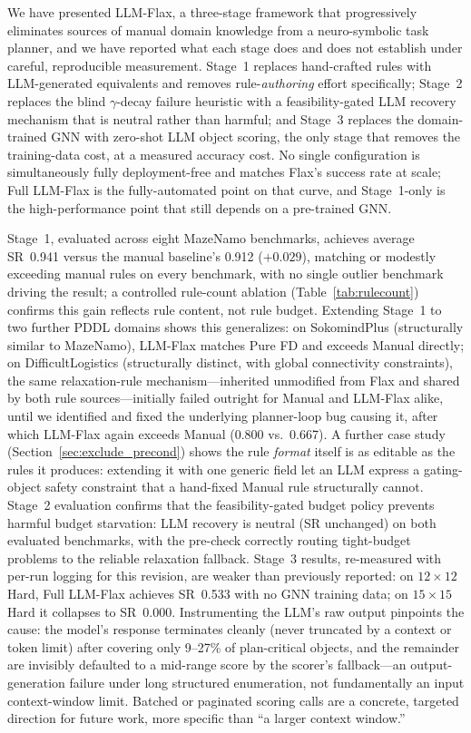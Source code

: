 \documentclass[letterpaper, 10pt, journal, twoside]{IEEEtran}
\newcommand{\sref}[1]{Section~\ref{#1}}
\newcommand{\tref}[1]{Table~\ref{#1}}
\newcommand{\method}{LLM-Flax\xspace}
\newcommand{\baseline}{Flax\xspace}
\newcommand{\fullmethod}{Full LLM-Flax\xspace}
\begin{document}
We have presented \method, a three-stage framework that progressively eliminates sources of manual domain knowledge from a neuro-symbolic task planner, and we have reported what each stage does and does not establish under careful, reproducible measurement.
Stage~1 replaces hand-crafted rules with LLM-generated equivalents and removes rule-\emph{authoring} effort specifically; Stage~2 replaces the blind $\gamma$-decay failure heuristic with a feasibility-gated LLM recovery mechanism that is neutral rather than harmful; and Stage~3 replaces the domain-trained GNN with zero-shot LLM object scoring, the only stage that removes the training-data cost, at a measured accuracy cost.
No single configuration is simultaneously fully deployment-free and matches \baseline's success rate at scale; \fullmethod is the fully-automated point on that curve, and Stage~1-only is the high-performance point that still depends on a pre-trained GNN.

Stage~1, evaluated across eight MazeNamo benchmarks, achieves average SR~0.941 versus the manual baseline's 0.912 ($+0.029$), matching or modestly exceeding manual rules on every benchmark, with no single outlier benchmark driving the result; a controlled rule-count ablation (\tref{tab:rulecount}) confirms this gain reflects rule content, not rule budget.
Extending Stage~1 to two further PDDL domains shows this generalizes: on SokomindPlus (structurally similar to MazeNamo), \method matches Pure FD and exceeds Manual directly; on DifficultLogistics (structurally distinct, with global connectivity constraints), the same relaxation-rule mechanism---inherited unmodified from \baseline and shared by both rule sources---initially failed outright for Manual and \method alike, until we identified and fixed the underlying planner-loop bug causing it, after which \method again exceeds Manual (0.800 vs.\ 0.667). A further case study (\sref{sec:exclude_precond}) shows the rule \emph{format} itself is as editable as the rules it produces: extending it with one generic field let an LLM express a gating-object safety constraint that a hand-fixed Manual rule structurally cannot.
Stage~2 evaluation confirms that the feasibility-gated budget policy prevents harmful budget starvation: LLM recovery is neutral (SR unchanged) on both evaluated benchmarks, with the pre-check correctly routing tight-budget problems to the reliable relaxation fallback.
Stage~3 results, re-measured with per-run logging for this revision, are weaker than previously reported: on $12{\times}12$ Hard, \fullmethod achieves SR~0.533 with no GNN training data; on $15{\times}15$ Hard it collapses to SR~0.000.
Instrumenting the LLM's raw output pinpoints the cause: the model's response terminates cleanly (never truncated by a context or token limit) after covering only 9--27\% of plan-critical objects, and the remainder are invisibly defaulted to a mid-range score by the scorer's fallback---an output-generation failure under long structured enumeration, not fundamentally an input context-window limit.
Batched or paginated scoring calls are a concrete, targeted direction for future work, more specific than ``a larger context window.''
\end{document}
